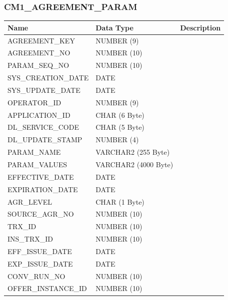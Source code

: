 \documentclass[12pt,twoside]{article}
\begin{document}
\subsubsection{CM1\_AGREEMENT\_PARAM}
\label{sec-8-3-1}

\scriptsize

\begin{center}
\begin{tabular}{lll}
\hline
 Name                 &  Data Type             &  Description  \\
\hline
 AGREEMENT\_KEY       &  NUMBER (9)            &               \\
 AGREEMENT\_NO        &  NUMBER (10)           &               \\
 PARAM\_SEQ\_NO       &  NUMBER (10)           &               \\
 SYS\_CREATION\_DATE  &  DATE                  &               \\
 SYS\_UPDATE\_DATE    &  DATE                  &               \\
 OPERATOR\_ID         &  NUMBER (9)            &               \\
 APPLICATION\_ID      &  CHAR (6 Byte)         &               \\
 DL\_SERVICE\_CODE    &  CHAR (5 Byte)         &               \\
 DL\_UPDATE\_STAMP    &  NUMBER (4)            &               \\
 PARAM\_NAME          &  VARCHAR2 (255 Byte)   &               \\
 PARAM\_VALUES        &  VARCHAR2 (4000 Byte)  &               \\
 EFFECTIVE\_DATE      &  DATE                  &               \\
 EXPIRATION\_DATE     &  DATE                  &               \\
 AGR\_LEVEL           &  CHAR (1 Byte)         &               \\
 SOURCE\_AGR\_NO      &  NUMBER (10)           &               \\
 TRX\_ID              &  NUMBER (10)           &               \\
 INS\_TRX\_ID         &  NUMBER (10)           &               \\
 EFF\_ISSUE\_DATE     &  DATE                  &               \\
 EXP\_ISSUE\_DATE     &  DATE                  &               \\
 CONV\_RUN\_NO        &  NUMBER (10)           &               \\
 OFFER\_INSTANCE\_ID  &  NUMBER (10)           &               \\
\hline
\end{tabular}
\end{center}
\end{document}
